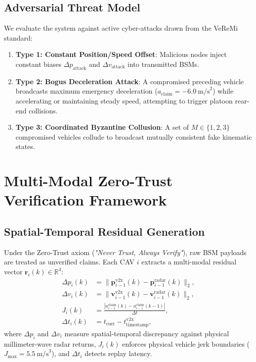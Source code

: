 \documentclass[journal]{IEEEtran}
\begin{document}
\subsection{Adversarial Threat Model}
We evaluate the system against active cyber-attacks drawn from the VeReMi standard:
\begin{enumerate}
    \item \textbf{Type 1: Constant Position/Speed Offset}: Malicious nodes inject constant biases $\Delta p_{\text{attack}}$ and $\Delta v_{\text{attack}}$ into transmitted BSMs.
    \item \textbf{Type 2: Bogus Deceleration Attack}: A compromised preceding vehicle broadcasts maximum emergency deceleration ($a_{\text{claim}} = -6.0~\text{m/s}^2$) while accelerating or maintaining steady speed, attempting to trigger platoon rear-end collisions.
    \item \textbf{Type 3: Coordinated Byzantine Collusion}: A set of $M \in \{1, 2, 3\}$ compromised vehicles collude to broadcast mutually consistent fake kinematic states.
\end{enumerate}

\section{Multi-Modal Zero-Trust Verification Framework}

\subsection{Spatial-Temporal Residual Generation}
Under the Zero-Trust axiom (\textit{"Never Trust, Always Verify"}), raw BSM payloads are treated as unverified claims. Each CAV $i$ extracts a multi-modal residual vector $\mathbf{r}_i(k) \in \mathbb{R}^4$:
\begin{align}
    \Delta p_i(k) &= \|\mathbf{p}_{i-1}^{\text{v2x}}(k) - \mathbf{p}_{i-1}^{\text{radar}}(k)\|_2, \\
    \Delta v_i(k) &= \|\mathbf{v}_{i-1}^{\text{v2x}}(k) - \mathbf{v}_{i-1}^{\text{radar}}(k)\|_2, \\
    J_i(k) &= \frac{|a_{i-1}^{\text{claim}}(k) - a_{i-1}^{\text{claim}}(k-1)|}{\Delta t}, \\
    \Delta t_i(k) &= t_{\text{curr}} - t_{\text{timestamp}}^{\text{v2x}},
\end{align}
where $\Delta p_i$ and $\Delta v_i$ measure spatial-temporal discrepancy against physical millimeter-wave radar returns, $J_i(k)$ enforces physical vehicle jerk boundaries ($J_{\max} = 5.5~\text{m/s}^3$), and $\Delta t_i$ detects replay latency.
\end{document}
